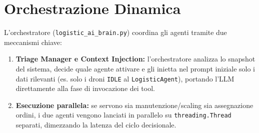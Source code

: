 \section{Orchestrazione Dinamica}
\label{sec:logistic_ai_brain}

L'orchestratore (\texttt{logistic\_ai\_brain.py}) coordina gli agenti tramite due meccanismi chiave:
\begin{enumerate}
    \item \textbf{Triage Manager e Context Injection:} l'orchestratore analizza lo snapshot del sistema, decide quale agente attivare e gli inietta nel prompt iniziale solo i dati rilevanti (es. solo i droni \texttt{IDLE} al \texttt{LogisticAgent}), portando l'LLM direttamente alla fase di invocazione dei tool.
    \item \textbf{Esecuzione parallela:} se servono sia manutenzione/scaling sia assegnazione ordini, i due agenti vengono lanciati in parallelo su \texttt{threading.Thread} separati, dimezzando la latenza del ciclo decisionale.
\end{enumerate}
